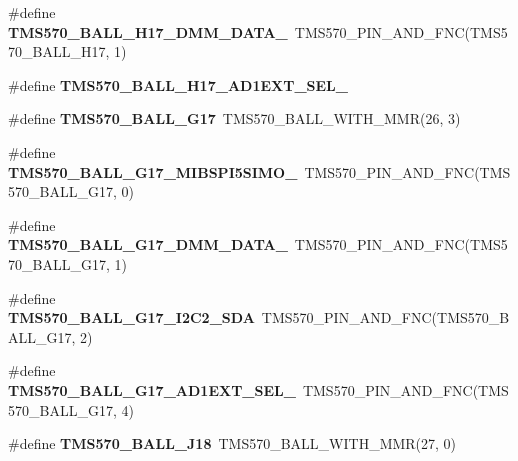 \begin{DoxyCompactItemize}
\item 
\mbox{\label{tms570lc4357-pins_8h_a7c20056b246adec6184fa591c9e7d68a}} 
\#define {\bfseries T\+M\+S570\+\_\+\+B\+A\+L\+L\+\_\+\+H17\+\_\+\+D\+M\+M\+\_\+\+D\+A\+T\+A\+\_}~T\+M\+S570\+\_\+\+P\+I\+N\+\_\+\+A\+N\+D\+\_\+\+F\+NC(T\+M\+S570\+\_\+\+B\+A\+L\+L\+\_\+\+H17, 1)
\item 
\#define {\bfseries T\+M\+S570\+\_\+\+B\+A\+L\+L\+\_\+\+H17\+\_\+\+A\+D1\+E\+X\+T\+\_\+\+S\+E\+L\+\_}
\item 
\mbox{\label{tms570lc4357-pins_8h_a7afe12f93d207f2ddef5df87e5229740}} 
\#define {\bfseries T\+M\+S570\+\_\+\+B\+A\+L\+L\+\_\+\+G17}~T\+M\+S570\+\_\+\+B\+A\+L\+L\+\_\+\+W\+I\+T\+H\+\_\+\+M\+MR(26, 3)
\item 
\mbox{\label{tms570lc4357-pins_8h_a8879a854b5a596297039a8c38f7da7f0}} 
\#define {\bfseries T\+M\+S570\+\_\+\+B\+A\+L\+L\+\_\+\+G17\+\_\+\+M\+I\+B\+S\+P\+I5\+S\+I\+M\+O\+\_}~T\+M\+S570\+\_\+\+P\+I\+N\+\_\+\+A\+N\+D\+\_\+\+F\+NC(T\+M\+S570\+\_\+\+B\+A\+L\+L\+\_\+\+G17, 0)
\item 
\mbox{\label{tms570lc4357-pins_8h_acf90932857f094d40ba51a2a59d99a3d}} 
\#define {\bfseries T\+M\+S570\+\_\+\+B\+A\+L\+L\+\_\+\+G17\+\_\+\+D\+M\+M\+\_\+\+D\+A\+T\+A\+\_}~T\+M\+S570\+\_\+\+P\+I\+N\+\_\+\+A\+N\+D\+\_\+\+F\+NC(T\+M\+S570\+\_\+\+B\+A\+L\+L\+\_\+\+G17, 1)
\item 
\mbox{\label{tms570lc4357-pins_8h_a5b2509e6340135849227b3b42ebd757a}} 
\#define {\bfseries T\+M\+S570\+\_\+\+B\+A\+L\+L\+\_\+\+G17\+\_\+\+I2\+C2\+\_\+\+S\+DA}~T\+M\+S570\+\_\+\+P\+I\+N\+\_\+\+A\+N\+D\+\_\+\+F\+NC(T\+M\+S570\+\_\+\+B\+A\+L\+L\+\_\+\+G17, 2)
\item 
\mbox{\label{tms570lc4357-pins_8h_a7a3b1eef1bd8ab6d193ac111e61ee53e}} 
\#define {\bfseries T\+M\+S570\+\_\+\+B\+A\+L\+L\+\_\+\+G17\+\_\+\+A\+D1\+E\+X\+T\+\_\+\+S\+E\+L\+\_}~T\+M\+S570\+\_\+\+P\+I\+N\+\_\+\+A\+N\+D\+\_\+\+F\+NC(T\+M\+S570\+\_\+\+B\+A\+L\+L\+\_\+\+G17, 4)
\item 
\mbox{\label{tms570lc4357-pins_8h_a6406c338c5fa6798c5564ce501ab1080}} 
\#define {\bfseries T\+M\+S570\+\_\+\+B\+A\+L\+L\+\_\+\+J18}~T\+M\+S570\+\_\+\+B\+A\+L\+L\+\_\+\+W\+I\+T\+H\+\_\+\+M\+MR(27, 0)

\end{DoxyCompactItemize}

